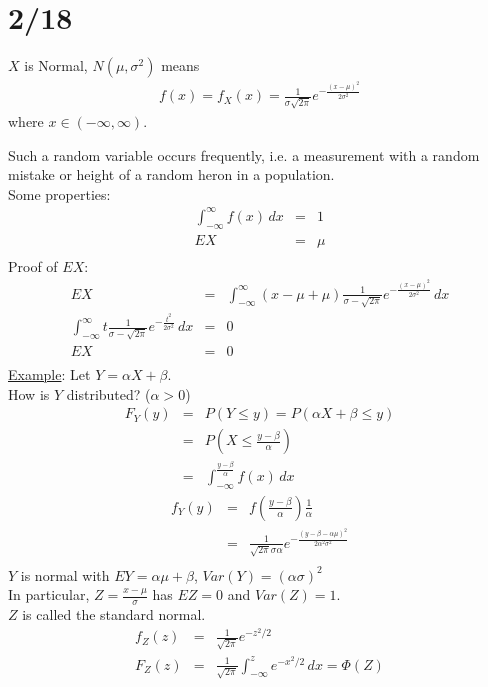 \section*{2/18}
  $X$ is Normal, $N(\mu, \sigma^2)$ means
  \begin{eqnarray*}
    f(x) = f_X(x) = \frac{1}{\sigma\sqrt{2\pi}} e^{-\frac{(x-\mu)^2}{2\sigma^2}}
  \end{eqnarray*}
  where $x \in (-\infty, \infty)$.

  Such a random variable occurs frequently, i.e. a measurement with a random 
  mistake or height of a random heron in a population.\\
  Some properties:
  \begin{eqnarray*}
    \int_{-\infty}^{\infty} f(x)\,dx & = & 1\\
    EX & = & \mu\\
  \end{eqnarray*}
  Proof of $EX$:
  \begin{eqnarray*}
    EX & = & \int_{-\infty}^{\infty} (x - \mu + \mu) \frac{1}{\sigma - 
      \sqrt{2\pi}}e^{-\frac{(x-\mu)^2}{2\sigma^2}}\,dx\\
    \int_{-\infty}^{\infty} t \frac{1}{\sigma - \sqrt{2\pi}}e^{-\frac{t^2}{2
      \sigma^2}}\,dx & = & 0\\
    EX & = & 0\\
  \end{eqnarray*}
  \underline{Example}: Let $Y = \alpha X + \beta$.\\
  How is $Y$ distributed? ($\alpha > 0$)
  \begin{eqnarray*}
    F_Y(y) &=& P(Y \le y) = P(\alpha X + \beta \le y)\\
    &=& P(X \le \frac{y - \beta}{\alpha})\\
    &=& \int_{-\infty}^{\frac{y - \beta}{\alpha}} f(x) \,dx
  \end{eqnarray*}
  \begin{eqnarray*}
    f_Y(y) &=& f(\frac{y - \beta}{\alpha})\frac{1}{\alpha}\\
      &=& \frac{1}{\sqrt{2\pi}\sigma\alpha} e^{-\frac{(y - \beta - 
        \alpha\mu)^2}{2 \alpha^2\sigma^2}}\\
  \end{eqnarray*}
  $Y$ is normal with $EY = \alpha\mu + \beta$, $Var(Y) = (\alpha \sigma)^2$\\
  In particular, $Z = \frac{x - \mu}{\sigma}$ has $EZ = 0$ and $Var(Z) = 1$.\\
  $Z$ is called the standard normal.
  \begin{eqnarray*}
  f_Z(z) & = & \frac{1}{\sqrt{2\pi}}e^{-z^2/2}\\
  F_Z(z) & = & \frac{1}{\sqrt{2\pi}}\int_{-\infty}^{z}e^{-x^2/2}\,dx = \Phi(Z)\\
  \end{eqnarray*}

